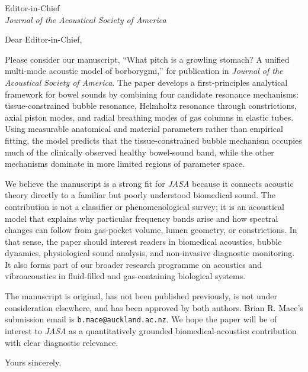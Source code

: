 \documentclass[11pt]{letter}
\date{\today}
\begin{document}
\begin{letter}{%
Editor-in-Chief\\
\textit{Journal of the Acoustical Society of America}}

\opening{Dear Editor-in-Chief,}
\small

Please consider our manuscript, ``What pitch is a growling stomach? A unified multi-mode acoustic model of borborygmi,'' for publication in \textit{Journal of the Acoustical Society of America}. The paper develops a first-principles analytical framework for bowel sounds by combining four candidate resonance mechanisms: tissue-constrained bubble resonance, Helmholtz resonance through constrictions, axial piston modes, and radial breathing modes of gas columns in elastic tubes. Using measurable anatomical and material parameters rather than empirical fitting, the model predicts that the tissue-constrained bubble mechanism occupies much of the clinically observed healthy bowel-sound band, while the other mechanisms dominate in more limited regions of parameter space.

We believe the manuscript is a strong fit for \textit{JASA} because it connects acoustic theory directly to a familiar but poorly understood biomedical sound. The contribution is not a classifier or phenomenological survey; it is an acoustical model that explains why particular frequency bands arise and how spectral changes can follow from gas-pocket volume, lumen geometry, or constrictions. In that sense, the paper should interest readers in biomedical acoustics, bubble dynamics, physiological sound analysis, and non-invasive diagnostic monitoring. It also forms part of our broader research programme on acoustics and vibroacoustics in fluid-filled and gas-containing biological systems.

The manuscript is original, has not been published previously, is not under consideration elsewhere, and has been approved by both authors. Brian R. Mace's submission email is \texttt{b.mace@auckland.ac.nz}. We hope the paper will be of interest to \textit{JASA} as a quantitatively grounded biomedical-acoustics contribution with clear diagnostic relevance.

\closing{Yours sincerely,}

\end{letter}
\end{document}
